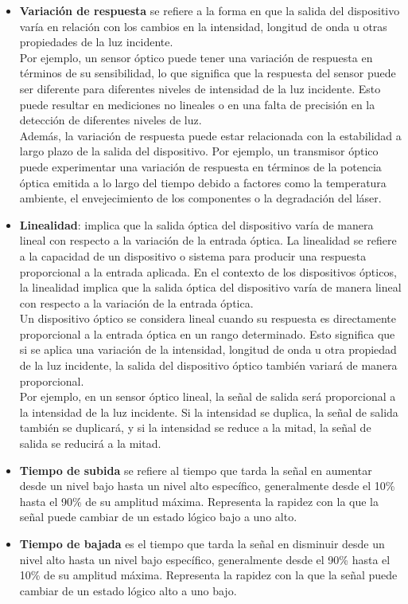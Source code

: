 \documentclass[
	12pt, %
	fleqn, %
	a4paper, %
	oneside, %
]{LegrandOrangeBook}
\begin{document}
\begin{itemize}
\item \textbf{Variación de respuesta} se refiere a la forma en que la salida del dispositivo varía en relación con los cambios en la intensidad, longitud de onda u otras propiedades de la luz incidente.\\
Por ejemplo, un sensor óptico puede tener una variación de respuesta en términos de su sensibilidad, lo que significa que la respuesta del sensor puede ser diferente para diferentes niveles de intensidad de la luz incidente. Esto puede resultar en mediciones no lineales o en una falta de precisión en la detección de diferentes niveles de luz.\\
Además, la variación de respuesta puede estar relacionada con la estabilidad a largo plazo de la salida del dispositivo. Por ejemplo, un transmisor óptico puede experimentar una variación de respuesta en términos de la potencia óptica emitida a lo largo del tiempo debido a factores como la temperatura ambiente, el envejecimiento de los componentes o la degradación del láser.

\item \textbf{Linealidad}: implica que la salida óptica del dispositivo varía de manera lineal con respecto a la variación de la entrada óptica. 
La linealidad se refiere a la capacidad de un dispositivo o sistema para producir una respuesta proporcional a la entrada aplicada. En el contexto de los dispositivos ópticos, la linealidad implica que la salida óptica del dispositivo varía de manera lineal con respecto a la variación de la entrada óptica.\\
Un dispositivo óptico se considera lineal cuando su respuesta es directamente proporcional a la entrada óptica en un rango determinado. Esto significa que si se aplica una variación de la intensidad, longitud de onda u otra propiedad de la luz incidente, la salida del dispositivo óptico también variará de manera proporcional.\\
Por ejemplo, en un sensor óptico lineal, la señal de salida será proporcional a la intensidad de la luz incidente. Si la intensidad se duplica, la señal de salida también se duplicará, y si la intensidad se reduce a la mitad, la señal de salida se reducirá a la mitad.

\item \textbf{Tiempo de subida} se refiere al tiempo que tarda la señal en aumentar desde un nivel bajo hasta un nivel alto específico, generalmente desde el 10\% hasta el 90\% de su amplitud máxima. Representa la rapidez con la que la señal puede cambiar de un estado lógico bajo a uno alto.

\item \textbf{Tiempo de bajada} es el tiempo que tarda la señal en disminuir desde un nivel alto hasta un nivel bajo específico, generalmente desde el 90\% hasta el 10\% de su amplitud máxima. Representa la rapidez con la que la señal puede cambiar de un estado lógico alto a uno bajo.
\end{itemize}
\end{document}

